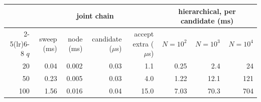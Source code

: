 \begin{tabular}{rrrrrrrr}
\toprule
 & \multicolumn{4}{c}{joint chain} & \multicolumn{3}{c}{hierarchical, per candidate (ms)} \\
\cmidrule(lr){2-5}\cmidrule(lr){6-8}
$q$ & sweep (ms) & node (ms) & candidate ($\mu$s) & accept extra ($\mu$s) & $N = 10^2$ & $N = 10^3$ & $N = 10^4$ \\
\midrule
20 & 0.04 & 0.002 & 0.03 & 1.1 & 0.25 & 2.4 & 24 \\
50 & 0.23 & 0.005 & 0.03 & 4.0 & 1.22 & 12.1 & 121 \\
100 & 1.56 & 0.016 & 0.04 & 15.0 & 7.03 & 70.3 & 704 \\
\bottomrule
\end{tabular}
